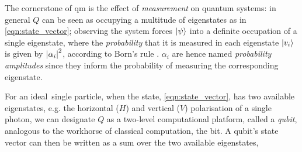 The cornerstone of \gls{qm} is the effect of \emph{measurement} on quantum systems: 
    in general $Q$ can be seen as occupying a multitude of eigenstates as in \cref{eqn:state_vector};
    observing the system forces $\ket{\psi}$ into a definite occupation of a single eigenstate,
    where the \emph{probability} that it is measured in each eigenstate $\ket{v_i}$ is given by $\left\lvert \alpha_i \right\rvert^2$, 
    according to Born's rule \cite{born1926quantenmechanik}.
$\alpha_i$ are hence named \emph{probability amplitudes} since they inform the probability of measuring the corresponding eigenstate. 
\par 

For an ideal\footnotemark \ single particle, when the state, \cref{eqn:state_vector}, has two available eigenstates, 
    e.g. the horizontal ($H$) and vertical ($V$) polarisation of a single photon, 
    we can designate $Q$ as a two-level computational platform, called a \emph{qubit}, 
    analogous to the workhorse of classical computation, the bit. 
A qubit's state vector can then be written as a sum over the two available eigenstates, 
